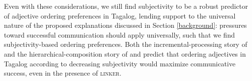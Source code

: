 \documentclass[12pt,letterpaper]{article}
\begin{document}
Even with these considerations, we still find subjectivity to be a robust predictor of adjective ordering preferences in Tagalog, lending support to the universal nature of the proposed explanations discussed in Section \ref{background}: pressures toward successful communication should apply universally, such that we find subjectivity-based ordering preferences. Both the incremental-processing story of \cite{hahnetal2018} and the hierarchical-composition story of \cite{simonic2018} and \cite{scontrasetalSPadjectives} predict that ordering adjectives in Tagalog according to decreasing subjectivity would maximize communicative success, even in the presence of \textsc{linker}.\\



\end{document}

